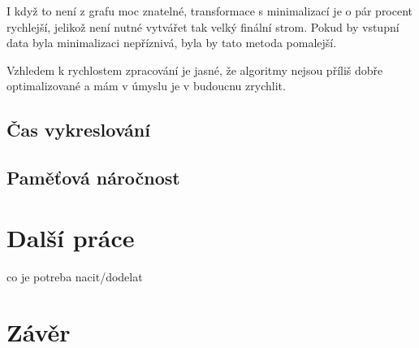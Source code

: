 I když to není z grafu moc znatelné, transformace s minimalizací je o pár procent rychlejší, jelikož není nutné vytvářet tak velký finální strom. Pokud by vstupní data byla minimalizaci nepříznivá, byla by tato metoda pomalejší.

Vzhledem k rychlostem zpracování je jasné, že algoritmy nejsou příliš dobře optimalizované a mám v úmyslu je v budoucnu zrychlit.

\section{Čas vykreslování}

\section{Paměťová náročnost}


\chapter{Další práce}
\label{dalsi_prace}
co je potreba nacit/dodelat


\chapter{Závěr}
\label{zaver}




